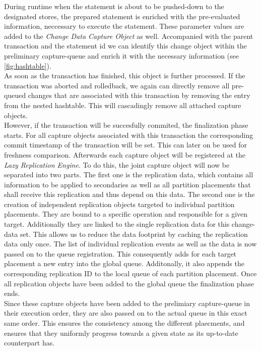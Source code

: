 During runtime when the statement is about to be pushed-down to the designated stores, the prepared statement is enriched with the pre-evaluated information, 
neccessary to execute the statement. These parameter values are added to the \emph{Change Data Capture Object} as well. 
Accompanied with the parent transaction and the statement id we can identify this change object within the preliminary capture-queue 
and enrich it with the necessary information (see \ref{fig:hashtable}).\\
As soon as the transaction has finished, this object is further processed. If the transaction was aborted and rolledback, we again can directly remove all pre-queued changes 
that are associated with this transaction by removing the entry from the nested hashtable. This will cascadingly remove all attached capture objects.\\
However, if the transaction will be succesfully commited, the finalization phase starts. For all capture objects associated with this transaction the corresponding commit 
timestamp of the transaction will be set. This can later on be used for freshness comparison. Afterwards each capture object will be registered at the \emph{Lazy Replication Engine}. 
To do this, the joint capture object will now be separated into two parts. The first one is the replication data, which contains all information to be applied to 
secondaries as well as all partition placements that shall receive this replication and thus depend on this data. The second one is the creation of independent replication 
objects targeted to individual partition placements. They are bound to a specific operation and responsible for a given target. Additionally they are linked to the single replication data for this change-data set.
This allows us to reduce the data footprint by caching the replication data only once. The list of individual replication events as well as the data is now passed on to the
queue registration. This consequently adds for each target placement a new entry into the global queue. Additonally, it also appends the corresponding replication ID to 
the local queue of each partition placement. Once all replication objects have been added to the global queue the finalization phase ends.\\
Since these capture objects have been added to the prelimiary capture-queue in their execution order, they are also passed on to the actual queue in this exact same order.
This ensures the consistency among the different plaecments, and ensures that they uniformly progress towards a given state as its up-to-date counterpart has.\\

